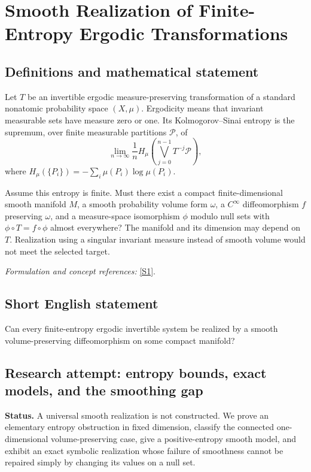 \documentclass[11pt]{article}
\begin{document}
\section*{\texorpdfstring{Smooth Realization of Finite-Entropy Ergodic Transformations}{Smooth Realization of Finite-Entropy Ergodic Transformations}}\label{30006948}
\subsection{Definitions and mathematical statement}
Let $T$ be an invertible ergodic measure-preserving transformation of a standard nonatomic probability space $(X,\mu)$. Ergodicity means that invariant measurable sets have measure zero or one. Its Kolmogorov--Sinai entropy is the supremum, over finite measurable partitions $\mathcal P$, of
\[
 \lim_{n\to\infty}\frac1n
 H_\mu\!\left(\bigvee_{j=0}^{n-1}T^{-j}\mathcal P\right),
\]
where $H_\mu(\{P_i\})=-\sum_i\mu(P_i)\log\mu(P_i)$.

Assume this entropy is finite. Must there exist a compact finite-dimensional smooth manifold $M$, a smooth probability volume form $\omega$, a $C^\infty$ diffeomorphism $f$ preserving $\omega$, and a measure-space isomorphism $\phi$ modulo null sets with $\phi\circ T=f\circ\phi$ almost everywhere? The manifold and its dimension may depend on $T$. Realization using a singular invariant measure instead of smooth volume would not meet the selected target.
\par\smallskip\textit{Formulation and concept references:} \href{https://arxiv.org/html/2203.10655}{[S1]}.

\subsection{Short English statement}
Can every finite-entropy ergodic invertible system be realized by a smooth volume-preserving diffeomorphism on some compact manifold?
\subsection{Research attempt: entropy bounds, exact models, and the smoothing gap}
\textbf{Status.} A universal smooth realization is not constructed. We prove an elementary entropy obstruction in fixed dimension, classify the connected one-dimensional volume-preserving case, give a positive-entropy smooth model, and exhibit an exact symbolic realization whose failure of smoothness cannot be repaired simply by changing its values on a null set.
\end{document}
